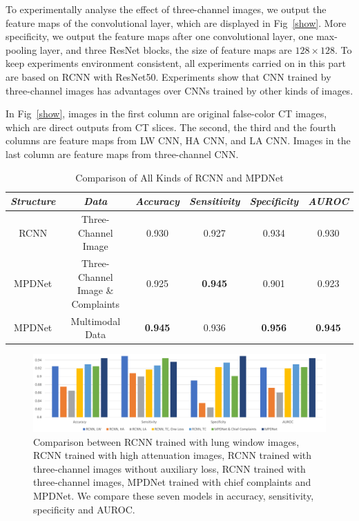 \documentclass[journal]{IEEEtran}
\begin{document}
To experimentally analyse the effect of three-channel images, we output the feature maps of the convolutional layer, which are displayed in Fig~\ref{show}. More specificity, we output the feature maps after one convolutional layer, one max-pooling layer, and three ResNet blocks, the size of feature maps are $128 \times 128$. To keep experiments environment consistent, all experiments carried on in this part are based on RCNN with ResNet50. Experiments show that CNN trained by three-channel images has advantages over CNNs trained by other kinds of images.


In Fig~\ref{show}, images in the first column are original false-color CT images, which are direct outputs from CT slices. The second, the third and the fourth columns are feature maps from LW CNN, HA CNN, and LA CNN. Images in the last column are feature maps from three-channel CNN. 

\begin{table}[htb]
    \caption{Comparison of All Kinds of RCNN and MPDNet}
    \begin{center}
    \begin{tabular}{c|c|c|c|c|c}
    \hline
    \textbf{\textit{Structure}} & \textbf{\textit{Data}}& \textbf{\textit{Accuracy}}  & \textbf{\textit{Sensitivity}} & \textbf{\textit{Specificity}} & \textbf{\textit{AUROC}}\\
    \hline
    RCNN & Three-Channel Image&  0.930 & 0.927 &  0.934 &  0.930 \\
    MPDNet & Three-Channel Image \& Complaints & 0.925 & {\bfseries 0.945} & 0.901 & 0.923 \\
    MPDNet & Multimodal Data&  {\bfseries 0.945} & 0.936 & {\bfseries 0.956} & {\bfseries 0.945} \\
    \hline
    \end{tabular}
    \vspace{-0cm}
    \end{center}
    \vspace{-0cm}
    \label{mpdnetres}
    \end{table}


\begin{figure}[htbp]
    \centerline{\includegraphics[width=180mm]{figureALL.pdf}}
    \vspace{-0cm}
    \caption{Comparison between RCNN trained with lung window images, RCNN trained with high attenuation images, RCNN trained with three-channel images without auxiliary loss, RCNN trained with three-channel images, MPDNet trained with chief complaints and MPDNet. We compare these seven models in accuracy, sensitivity, specificity and AUROC.}
    \vspace{-0cm}
    \label{figureALL}

    \end{figure}
\end{document}
